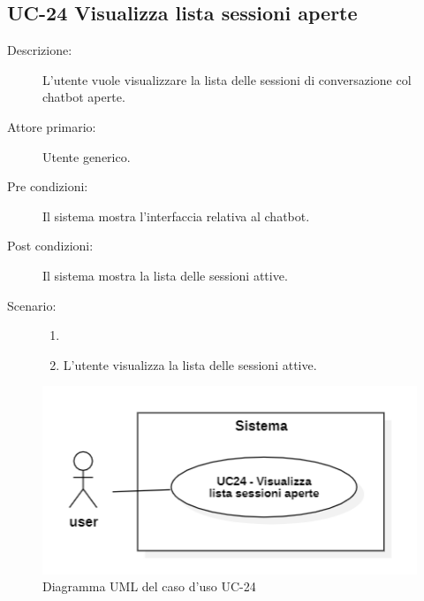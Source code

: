 \subsection{UC-24 Visualizza lista sessioni aperte}
\begin{description}
    \item[Descrizione:] L'utente vuole visualizzare la lista delle sessioni di conversazione col chatbot aperte.
    \item[Attore primario:] Utente generico.
    \item[Pre condizioni:] Il sistema mostra l'interfaccia relativa al chatbot.
    \item[Post condizioni:] Il sistema mostra la lista delle sessioni attive.
    \item[Scenario:]
    \begin{enumerate}
        \item[]
        \item L'utente visualizza la lista delle sessioni attive.
    \end{enumerate}
\end{description}

\begin{figure}[H]
    \centering
    \includegraphics[width=0.8\linewidth]{UC24.PNG}
    \caption{Diagramma UML del caso d'uso UC-24}
    \label{fig:UC24}
\end{figure}

